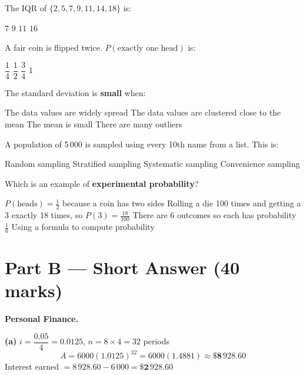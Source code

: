 \documentclass[addpoints]{exam}
\begin{document}
\begin{questions}
\question[1] The IQR of $\{2, 5, 7, 9, 11, 14, 18\}$ is:
\begin{choices}
    \choice $7$
    \correctchoice $9$
    \choice $11$
    \choice $16$
\end{choices}

\question[1] A fair coin is flipped twice. $P(\text{exactly one head})$ is:
\begin{choices}
    \choice $\dfrac{1}{4}$
    \correctchoice $\dfrac{1}{2}$
    \choice $\dfrac{3}{4}$
    \choice $1$
\end{choices}

\question[1] The standard deviation is \textbf{small} when:
\begin{choices}
    \choice The data values are widely spread
    \correctchoice The data values are clustered close to the mean
    \choice The mean is small
    \choice There are many outliers
\end{choices}

\question[1] A population of 5\,000 is sampled using every 10th name from a list. This is:
\begin{choices}
    \choice Random sampling
    \choice Stratified sampling
    \correctchoice Systematic sampling
    \choice Convenience sampling
\end{choices}

\question[1] Which is an example of \textbf{experimental probability}?
\begin{choices}
    \choice $P(\text{heads}) = \tfrac{1}{2}$ because a coin has two sides
    \correctchoice Rolling a die 100 times and getting a 3 exactly 18 times, so $P(3) = \tfrac{18}{100}$
    \choice There are 6 outcomes so each has probability $\tfrac{1}{6}$
    \choice Using a formula to compute probability
\end{choices}


\section*{Part B --- Short Answer (40 marks)}

\question[8] \textbf{Personal Finance.}
\begin{solution}[10cm]
\textbf{(a)} $i = \dfrac{0.05}{4} = 0.0125$, $n = 8 \times 4 = 32$ periods
\[A = 6000(1.0125)^{32} = 6000(1.4881) \approx \mathbf{\$8\,928.60}\]
Interest earned $= 8\,928.60 - 6\,000 = \mathbf{\$2\,928.60}$


\end{solution}
\end{questions}
\end{document}
